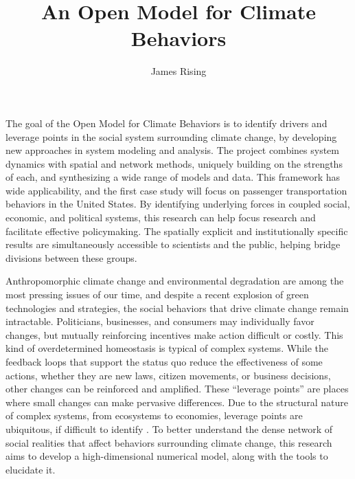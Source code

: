 \documentclass[12pt, oneside]{amsart}
\title{An Open Model for Climate Behaviors}
\author{James Rising}
\begin{document}
\maketitle


The goal of the Open Model for Climate Behaviors is to identify drivers and leverage points in the social system surrounding climate change, by developing new approaches in system modeling and analysis.  The project combines system dynamics with spatial and network methods, uniquely building on the strengths of each, and synthesizing a wide range of models and data.  This framework has wide applicability, and the first case study will focus on passenger transportation behaviors in the United States.  By identifying underlying forces in coupled social, economic, and political systems, this research can help focus research and facilitate effective policymaking.  The spatially explicit and institutionally specific results are simultaneously accessible to scientists and the public, helping bridge divisions between these groups.

Anthropomorphic climate change and environmental degradation are among the most pressing issues of our time, and despite a recent explosion of green technologies and strategies, the social behaviors that drive climate change remain intractable. Politicians, businesses, and consumers may individually favor changes, but mutually reinforcing incentives make action difficult or costly. This kind of overdetermined homeostasis is typical of complex systems. While the feedback loops that support the status quo reduce the effectiveness of some actions, whether they are new laws, citizen movements, or business decisions, other changes can be reinforced and amplified.  These ``leverage points'' are places where small changes can make pervasive differences.  Due to the structural nature of complex systems, from ecosystems to economies, leverage points are ubiquitous, if difficult to identify \citep{meadows1997places}.  To better understand the dense network of social realities that affect behaviors surrounding climate change, this research aims to develop a high-dimensional numerical model, along with the tools to elucidate it.
\end{document}
